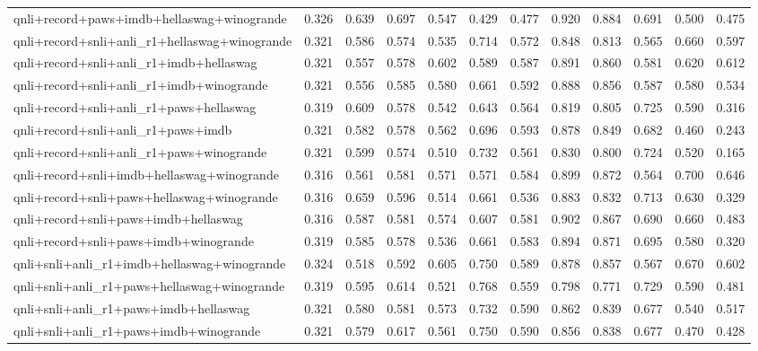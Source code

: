 \begin{table}[t]
\begin{tabular}{lrrrrrrrrrrr}
    qnli+record+paws+imdb+hellaswag+winogrande & 0.326 & 0.639 & 0.697 & 0.547 & 0.429 & 0.477 & 0.920 & 0.884 & 0.691 & 0.500 & 0.475 \\
    qnli+record+snli+anli\_r1+hellaswag+winogrande & 0.321 & 0.586 & 0.574 & 0.535 & 0.714 & 0.572 & 0.848 & 0.813 & 0.565 & 0.660 & 0.597 \\
    qnli+record+snli+anli\_r1+imdb+hellaswag & 0.321 & 0.557 & 0.578 & 0.602 & 0.589 & 0.587 & 0.891 & 0.860 & 0.581 & 0.620 & 0.612 \\
    qnli+record+snli+anli\_r1+imdb+winogrande & 0.321 & 0.556 & 0.585 & 0.580 & 0.661 & 0.592 & 0.888 & 0.856 & 0.587 & 0.580 & 0.534 \\
    qnli+record+snli+anli\_r1+paws+hellaswag & 0.319 & 0.609 & 0.578 & 0.542 & 0.643 & 0.564 & 0.819 & 0.805 & 0.725 & 0.590 & 0.316 \\
    qnli+record+snli+anli\_r1+paws+imdb & 0.321 & 0.582 & 0.578 & 0.562 & 0.696 & 0.593 & 0.878 & 0.849 & 0.682 & 0.460 & 0.243 \\
    qnli+record+snli+anli\_r1+paws+winogrande & 0.321 & 0.599 & 0.574 & 0.510 & 0.732 & 0.561 & 0.830 & 0.800 & 0.724 & 0.520 & 0.165 \\
    qnli+record+snli+imdb+hellaswag+winogrande & 0.316 & 0.561 & 0.581 & 0.571 & 0.571 & 0.584 & 0.899 & 0.872 & 0.564 & 0.700 & 0.646 \\
    qnli+record+snli+paws+hellaswag+winogrande & 0.316 & 0.659 & 0.596 & 0.514 & 0.661 & 0.536 & 0.883 & 0.832 & 0.713 & 0.630 & 0.329 \\
    qnli+record+snli+paws+imdb+hellaswag & 0.316 & 0.587 & 0.581 & 0.574 & 0.607 & 0.581 & 0.902 & 0.867 & 0.690 & 0.660 & 0.483 \\
    qnli+record+snli+paws+imdb+winogrande & 0.319 & 0.585 & 0.578 & 0.536 & 0.661 & 0.583 & 0.894 & 0.871 & 0.695 & 0.580 & 0.320 \\
    qnli+snli+anli\_r1+imdb+hellaswag+winogrande & 0.324 & 0.518 & 0.592 & 0.605 & 0.750 & 0.589 & 0.878 & 0.857 & 0.567 & 0.670 & 0.602 \\
    qnli+snli+anli\_r1+paws+hellaswag+winogrande & 0.319 & 0.595 & 0.614 & 0.521 & 0.768 & 0.559 & 0.798 & 0.771 & 0.729 & 0.590 & 0.481 \\
    qnli+snli+anli\_r1+paws+imdb+hellaswag & 0.321 & 0.580 & 0.581 & 0.573 & 0.732 & 0.590 & 0.862 & 0.839 & 0.677 & 0.540 & 0.517 \\
    qnli+snli+anli\_r1+paws+imdb+winogrande & 0.321 & 0.579 & 0.617 & 0.561 & 0.750 & 0.590 & 0.856 & 0.838 & 0.677 & 0.470 & 0.428 \\

\end{tabular}
\end{table}
